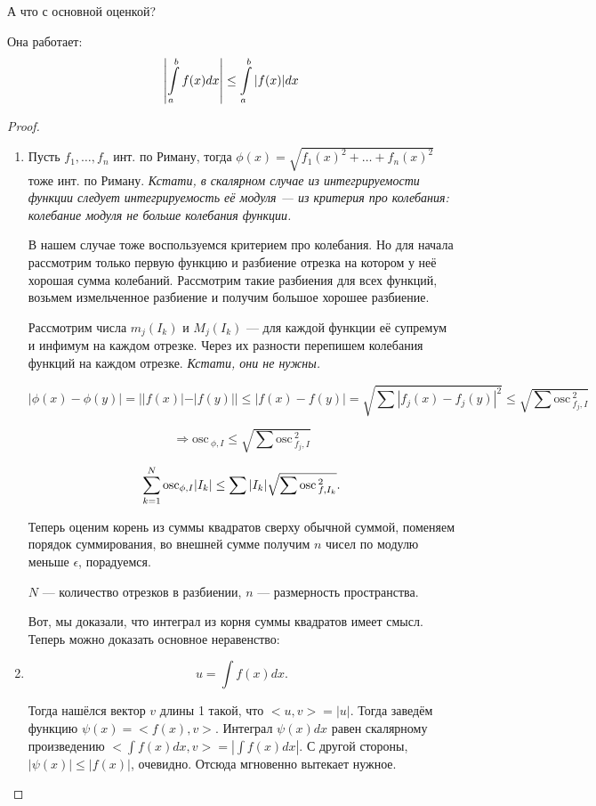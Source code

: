 \documentclass[12pt]{report}
\begin{document}
А что с основной оценкой?

\begin{st}
Она работает:
$$\left|\int\limits_{a}^{b}{f(x)dx}\right| \le \int\limits_{a}^{b}{|f(x)|dx}$$
\end{st}

\begin{proof}
\begin{enumerate}
\item 
Пусть $f_1,\ldots,f_n$ инт. по Риману, тогда $\phi(x)=\sqrt{f_1(x)^2 + \ldots + f_n(x)^2}$ тоже инт. по Риману. {\it Кстати, в скалярном случае из интегрируемости функции следует интегрируемость её модуля --- из критерия про колебания: колебание модуля не больше колебания функции.}

В нашем случае тоже воспользуемся критерием про колебания. Но для начала рассмотрим только первую функцию и разбиение отрезка на котором у неё хорошая сумма колебаний. Рассмотрим такие разбиения для всех функций, возьмем измельченное разбиение и получим большое хорошее разбиение.

Рассмотрим числа $m_j(I_k)$ и $M_j(I_k)$ --- для каждой функции её супремум и инфимум на каждом отрезке. Через их разности перепишем колебания функций на каждом отрезке. {\it Кстати, они не нужны.}


$$|\phi(x)-\phi(y)| = ||f(x)|-|f(y)|| \le |f(x)-f(y)| =
  \sqrt{\sum|f_j(x)-f_j(y)|^2} \le \sqrt{\sum \mathrm{osc\,}_{f_j,I}^2}$$

$$\Rightarrow \mathrm{osc\,}_{\phi,I} \le \sqrt{\sum \mathrm{osc\,}_{f_j,I}^2}$$

$$\sum\limits_{k=1}^{N}{\mathrm{osc}_{\phi,I} |I_k|} \le \sum|I_k| \sqrt{\sum \mathrm{osc\,}_{f,I_k}^2}.$$

Теперь оценим корень из суммы квадратов сверху обычной суммой, поменяем порядок суммирования, во внешней сумме получим $n$ чисел по модулю меньше $\epsilon$, порадуемся.

$N$ --- количество отрезков в разбиении, $n$ --- размерность пространства.

Вот, мы доказали, что интеграл из корня суммы квадратов имеет смысл. Теперь можно доказать основное неравенство:

\item
$$u = \int f(x)dx.$$

Тогда нашёлся вектор $v$ длины 1 такой, что $<u,v> = |u|$. Тогда заведём функцию $\psi (x) = <f(x),v>$. Интеграл $\psi(x)dx$ равен скалярному произведению $<\int f(x)dx,v> = |\int f(x)dx|$. С другой стороны, $|\psi(x)| \le |f(x)|$, очевидно. Отсюда мгновенно вытекает нужное.

\end{enumerate}
\end{proof}
\end{document}
